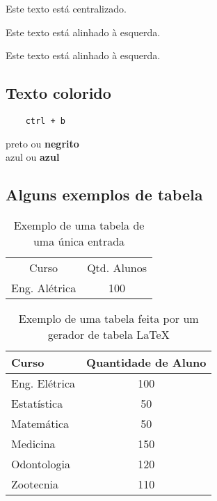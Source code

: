 \documentclass[a4paper, 11pt]{book}  %
\begin{document}
\begin{center}
    Este texto está centralizado.
\end{center}

\begin{flushleft}
   Este texto está alinhado à esquerda.
\end{flushleft}

\begin{flushright}
    Este texto está alinhado à esquerda.
\end{flushright}
    
\subsection{Texto colorido}

\begin{verbatim}
    ctrl + b 
\end{verbatim}

{\color{black} preto ou \textbf{negrito}} \\
{\color{blue} azul ou \textbf{azul}} \\


\subsection{Alguns exemplos de tabela}

\begin{table}[H]    %
    \centering
    \caption{Exemplo de uma tabela de uma única entrada}
    \begin{tabular}{c|c}
         Curso& Qtd. Alunos  \\
         Eng. Alétrica& 100 \\ 
    \end{tabular}
    \label{tab:my_label}
\end{table}

\begin{table}[H]
\centering
\caption{Exemplo de uma tabela feita por um gerador de tabela LaTeX}
\label{tab:curso}
\begin{tabular}{lc}
\hline
\hline
\textbf{Curso} & \textbf{Quantidade de Aluno} \\ \hline
Eng. Elétrica  & 100                          \\
Estatística    & 50                           \\
Matemática     & 50                           \\
Medicina       & 150                          \\
Odontologia    & 120                          \\
Zootecnia      & 110                          \\ \hline
\hline
\end{tabular}
\end{table}
\end{document}
